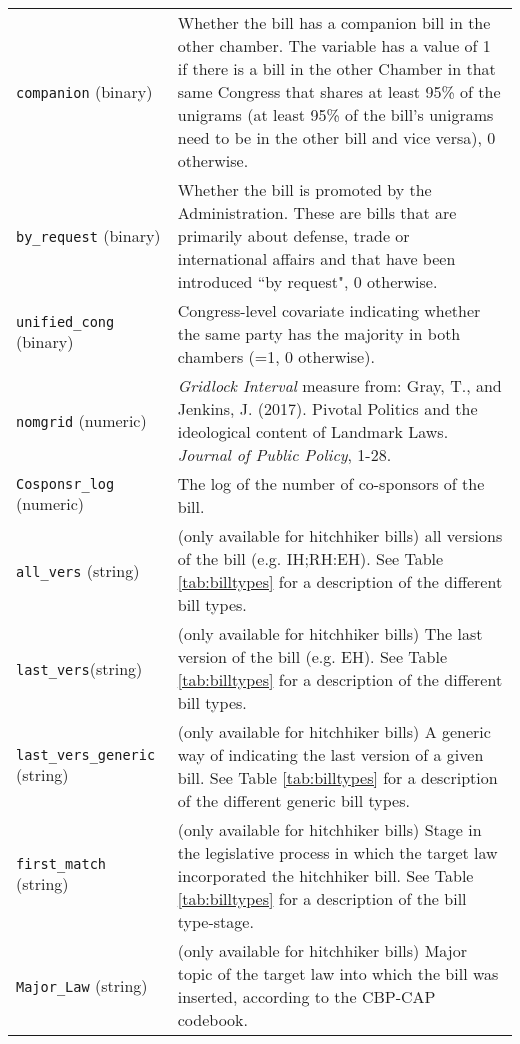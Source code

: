 \documentclass[10pt,a4paper]{article}
\begin{document}
\hspace*{-1.25cm}\begin{tabular}{lL{11.5cm}}
\texttt{companion} (binary) & Whether the bill has a companion bill in the other chamber. The variable has a value of 1 if there is a bill in the other Chamber in that same Congress that shares at least 95\% of the unigrams (at least 95\% of the bill's unigrams need to be in the other bill and vice versa), 0 otherwise.  \\
\texttt{by\_request} (binary) & Whether the bill is promoted by the Administration. These are bills that are primarily about defense, trade or international affairs and that have been introduced ``by request", 0 otherwise. \\
\texttt{unified\_cong} (binary) & Congress-level covariate indicating whether the same party has the majority in both chambers (=1, 0 otherwise). \\
\texttt{nomgrid} (numeric) & \textit{Gridlock Interval} measure from: Gray, T., and Jenkins, J. (2017). Pivotal Politics and the ideological content of Landmark Laws. \textit{Journal of Public Policy}, 1-28. \\
\texttt{Cosponsr\_log} (numeric) & The log of the number of co-sponsors of the bill. \\
\texttt{all\_vers}	(string) & (only available for hitchhiker bills) all versions of the bill (e.g. IH;RH:EH).  See Table \ref{tab:billtypes} for a description of the different bill types. \\
\texttt{last\_vers}(string) &  (only available for hitchhiker bills) The last version of the bill (e.g. EH). See Table \ref{tab:billtypes} for a description of the different bill types. \\
\texttt{last\_vers\_generic}	(string) &  (only available for hitchhiker bills) A generic way of indicating the last version of a given bill. See Table \ref{tab:billtypes} for a description of the different generic bill types. \\
\texttt{first\_match}	(string) & (only available for hitchhiker bills) Stage in the legislative process in which the target law incorporated the hitchhiker bill.  See Table \ref{tab:billtypes} for a description of the bill type-stage. \\
\texttt{Major\_Law}	(string) & (only available for hitchhiker bills) Major topic of the target law into which the bill was inserted, according to the CBP-CAP codebook. \\
\end{tabular}
\end{document}
